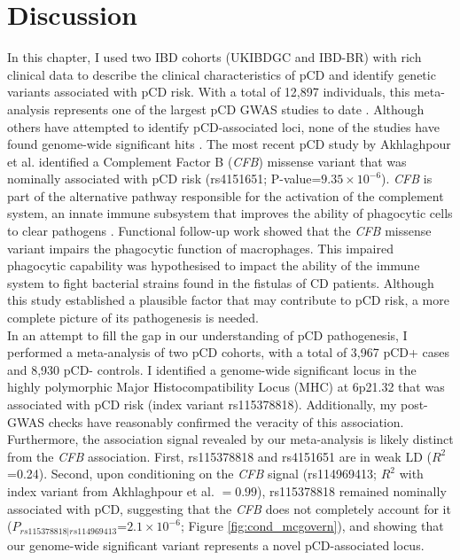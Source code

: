   
\section{Discussion}
In this chapter, I used two IBD cohorts (UKIBDGC and IBD-BR) with rich clinical data to describe the clinical characteristics of pCD and identify genetic variants associated with pCD risk. With a total of 12,897 individuals, this meta-analysis represents one of the largest pCD GWAS studies to date \cite{Akhlaghpour2023-jw}. Although others have attempted to identify pCD-associated loci, none of the studies have found genome-wide significant hits \cite{Akhlaghpour2023-jw,Kaur2016-ut}. The most recent pCD study by Akhlaghpour et al. identified a Complement Factor B (\textit{CFB}) missense variant that was nominally associated with pCD risk (rs4151651; P-value=$9.35\times10^{-6}$). \textit{CFB} is part of the alternative pathway responsible for the activation of the complement system, an innate immune subsystem that improves the ability of phagocytic cells to clear pathogens \cite{Huang2002-of,Goring2009-cs}. Functional follow-up work showed that the \textit{CFB} missense variant impairs the phagocytic function of macrophages. This impaired phagocytic capability was hypothesised to impact the ability of the immune system to fight bacterial strains found in the fistulas of CD patients. Although this study established a plausible factor that may contribute to pCD risk, a more complete picture of its pathogenesis is needed.\\


In an attempt to fill the gap in our understanding of pCD pathogenesis, I performed a meta-analysis of two pCD cohorts, with a total of 3,967 pCD+ cases and 8,930 pCD- controls. I identified a genome-wide significant locus in the highly polymorphic Major Histocompatibility Locus (MHC) at 6p21.32 that was associated with pCD risk (index variant rs115378818). Additionally, my post-GWAS checks have reasonably confirmed the veracity of this association. Furthermore, the association signal revealed by our meta-analysis is likely distinct from the \textit{CFB} association. First, rs115378818 and rs4151651 are in weak LD ($R^{2}$=0.24). Second, upon conditioning on the \textit{CFB} signal (rs114969413; $R^{2}$ with index variant from Akhlaghpour et al. $=0.99$), rs115378818 remained nominally associated with pCD, suggesting that the \textit{CFB} does not completely account for it ($P_{rs115378818|rs114969413}$=$2.1\times10^{-6}$; Figure \ref{fig:cond_mcgovern}), and showing that our genome-wide significant variant represents a novel pCD-associated locus. \\


